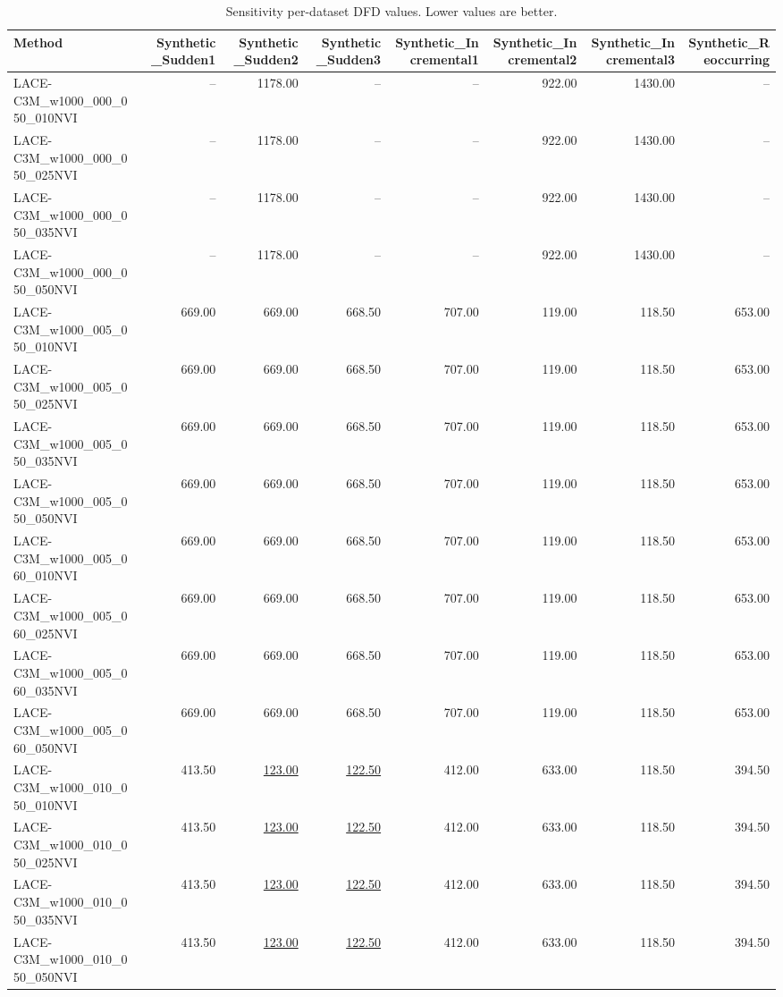 \begin{table}
\caption{Sensitivity per-dataset DFD values. Lower values are better.}
\label{tab:per-data-sensitivity-delay-for-detection}
\begin{tabular}{lrrrrrrr}
\toprule
Method & Synthetic\_Sudden1 & Synthetic\_Sudden2 & Synthetic\_Sudden3 & Synthetic\_Incremental1 & Synthetic\_Incremental2 & Synthetic\_Incremental3 & Synthetic\_Reoccurring \\
\midrule
LACE-C3M\_w1000\_000\_050\_010NVI & -- & 1178.00 & -- & -- & 922.00 & 1430.00 & -- \\
LACE-C3M\_w1000\_000\_050\_025NVI & -- & 1178.00 & -- & -- & 922.00 & 1430.00 & -- \\
LACE-C3M\_w1000\_000\_050\_035NVI & -- & 1178.00 & -- & -- & 922.00 & 1430.00 & -- \\
LACE-C3M\_w1000\_000\_050\_050NVI & -- & 1178.00 & -- & -- & 922.00 & 1430.00 & -- \\
LACE-C3M\_w1000\_005\_050\_010NVI & 669.00 & 669.00 & 668.50 & 707.00 & 119.00 & 118.50 & 653.00 \\
LACE-C3M\_w1000\_005\_050\_025NVI & 669.00 & 669.00 & 668.50 & 707.00 & 119.00 & 118.50 & 653.00 \\
LACE-C3M\_w1000\_005\_050\_035NVI & 669.00 & 669.00 & 668.50 & 707.00 & 119.00 & 118.50 & 653.00 \\
LACE-C3M\_w1000\_005\_050\_050NVI & 669.00 & 669.00 & 668.50 & 707.00 & 119.00 & 118.50 & 653.00 \\
LACE-C3M\_w1000\_005\_060\_010NVI & 669.00 & 669.00 & 668.50 & 707.00 & 119.00 & 118.50 & 653.00 \\
LACE-C3M\_w1000\_005\_060\_025NVI & 669.00 & 669.00 & 668.50 & 707.00 & 119.00 & 118.50 & 653.00 \\
LACE-C3M\_w1000\_005\_060\_035NVI & 669.00 & 669.00 & 668.50 & 707.00 & 119.00 & 118.50 & 653.00 \\
LACE-C3M\_w1000\_005\_060\_050NVI & 669.00 & 669.00 & 668.50 & 707.00 & 119.00 & 118.50 & 653.00 \\
LACE-C3M\_w1000\_010\_050\_010NVI & 413.50 & \underline{123.00} & \underline{122.50} & 412.00 & 633.00 & 118.50 & 394.50 \\
LACE-C3M\_w1000\_010\_050\_025NVI & 413.50 & \underline{123.00} & \underline{122.50} & 412.00 & 633.00 & 118.50 & 394.50 \\
LACE-C3M\_w1000\_010\_050\_035NVI & 413.50 & \underline{123.00} & \underline{122.50} & 412.00 & 633.00 & 118.50 & 394.50 \\
LACE-C3M\_w1000\_010\_050\_050NVI & 413.50 & \underline{123.00} & \underline{122.50} & 412.00 & 633.00 & 118.50 & 394.50 \\

\end{tabular}
\end{table}
